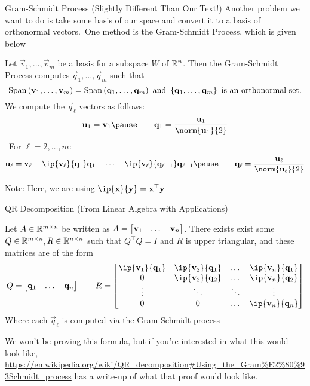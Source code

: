 \documentclass[xcoler=dvipsnames, aspectratio=169]{beamer}
\begin{document}
    \begin{frame}{Gram-Schmidt Process (Slightly Different Than Our Text!)}
        Another problem we want to do is take some basis of our space and convert it to a basis
        of orthonormal vectors.\pause\ One method is the Gram-Schmidt Process, which is given below\pause
        \begin{defn}
            \footnotesize
            Let $\vec{v}_1,\dots,\vec{v}_m$ be a basis for a subspace $W$ of $\mathbb{R}^n$. Then the Gram-Schmidt
            Process computes $\vec{q}_1,\dots,\vec{q}_m$ such that
            \[
                \text{Span}\left(\mathbf{v}_1,\dots,\mathbf{v}_m\right) = \text{Span}\left(\mathbf{q}_1,\dots,\mathbf{q}_m\right)\textnormal{ and }
                \left\{\mathbf{q}_1,\dots,\mathbf{q}_m\right\}\textnormal{ is an orthonormal set.}
            \]\pause
            We compute the $\vec{q}_\ell$ vectors as follows:
            \[
                \vec{u}_1 = \vec{v}_1\pause\qquad \vec{q}_1 = \frac{\vec{u}_1}{\norm{\vec{u}_1}{2}}
            \]\pause\
            For $\ell=2,\dots, m$:
            \[
                \vec{u}_\ell = \vec{v}_\ell - \ip{\vec{v}_\ell}{\vec{q}_{1}}\vec{q}_1 - \cdots - 
                \ip{\vec{v}_\ell}{\vec{q}_{\ell-1}}\vec{q}_{\ell-1}\pause\qquad 
                \vec{q}_\ell = \frac{\vec{u}_\ell}{\norm{\vec{u}_\ell}{2}}
            \]\pause
        \end{defn}
        Note: Here, we are using $\ip{\vec{x}}{\vec{y}} = \vec{x}^\top\vec{y}$
    \end{frame}
    \begin{frame}{QR Decomposition (From Linear Algebra with Applications)}
        \begin{theorem}
            Let $A\in\mathbb{R}^{m\times n}$ be written as $A = \begin{bmatrix}\mathbf{v}_1 & \dots & \mathbf{v}_n\end{bmatrix}$.
            There exists exist some $Q\in\mathbb{R}^{m\times n},R\in\mathbb{R}^{n\times n}$ such that $Q^\top Q=I$
            and $R$ is upper triangular, and these matrices are of the form
            \[
                Q = \bMat{
                    \vec{q}_1 & \dots & \vec{q}_n
                } \qquad R = \bMat{
                    \ip{\vec{v}_1}{\vec{q}_1} & \ip{\vec{v}_2}{\vec{q}_1} & \dots & \ip{\vec{v}_n}{\vec{q}_1}\\
                    0 & \ip{\vec{v}_2}{\vec{q}_2} & \dots & \ip{\vec{v}_n}{\vec{q}_2}\\
                    \vdots & \ddots & \ddots & \vdots\\
                    0 & 0 & \dots & \ip{\vec{v}_n}{\vec{q}_n}
                }
            \]
            Where each $\vec{q}_\ell$ is computed via the Gram-Schmidt process
        \end{theorem}\pause
        We won't be proving this formula, but if you're interested in what this would look like,
        \url{https://en.wikipedia.org/wiki/QR\_decomposition\#Using\_the\_Gram\%E2\%80\%93Schmidt\_process}
        has a write-up of what that proof would look like.
    \end{frame}
\end{document}
